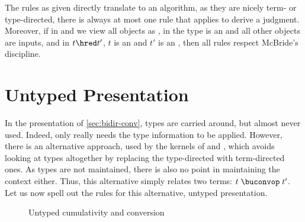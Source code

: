 The rules as given directly translate to an algorithm, as they are nicely term- or type-directed,
\ie there is always at most one rule that applies to derive a judgment. Moreover,
if in  and  we view all objects as ,%
%
in  the type is an  and all other objects are inputs,
and in  $t \hred t'$, $t$ is an  and $t'$ is an , then
all rules respect McBride’s discipline.

\section{Untyped Presentation}
\label{sec:unty-conv}

In the presentation of \cref{sec:bidir-conv}, types are carried around,
but almost never used. Indeed,
only  really needs the type information to be applied.
However, there is an alternative approach, used by the kernels of 
and , which avoids looking at types altogether by replacing the
type-directed  with term-directed ones.
As types are not maintained, there is also no point in maintaining the context either.
Thus, this alternative  simply relates two terms: $\buconv{\gamma}{t}{t'}$.%
Let us now spell out the rules for this alternative, untyped presentation.

\begin{figure}[h]
  \ContinuedFloat*
  \caption{Untyped cumulativity and conversion}
  \label{fig:gene-ucum}
\end{figure}

